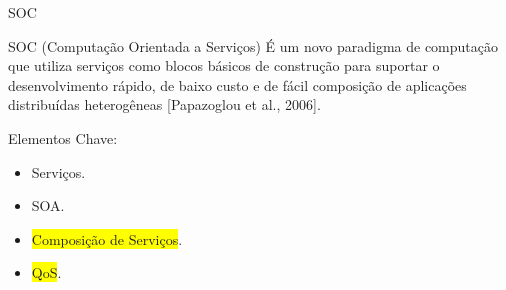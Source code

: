 \documentclass[xcolor=svgnames]{beamer}
\begin{document}
    \begin{frame}{SOC}
       	\begin{block}{SOC (Computação Orientada a Serviços)}\vspace{-.3\baselineskip}
           É um novo paradigma de computação que utiliza serviços como blocos básicos de construção
           para suportar o desenvolvimento rápido, de baixo custo e de fácil composição de aplicações
           distribuídas heterogêneas [Papazoglou et al., 2006]. %
        \end{block}
        Elementos Chave:

        \begin{itemize}
           \item Serviços.
           \item SOA.
           \item \colorbox{yellow}{Composição de Serviços}.
           \item \colorbox{yellow}{QoS}.
        \end{itemize}


        \tiny{
        }
        	
    \end{frame}


\end{document}
